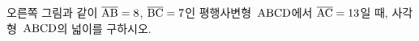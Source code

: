 \noindent\begin{minipage}[t]{0.58\linewidth}\vspace{0pt}\raggedright 오른쪽 그림과 같이 $\overline{\mathrm{AB}}=8$, $\overline{\mathrm{BC}}=7$인 평행사변형~$\mathrm{ABCD}$에서 $\overline{\mathrm{AC}}=13$일 때, 사각형~$\mathrm{ABCD}$의 넓이를 구하시오.\end{minipage}\hfill\begin{minipage}[t]{0.4\linewidth}\vspace{0pt}\centering \resizebox{\ifdim\width>\linewidth\linewidth\else\width\fi}{!}{}\end{minipage}\par
